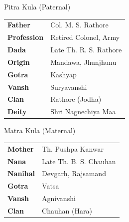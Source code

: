 \documentclass[11pt,a4paper]{article}
\begin{document}
\noindent
\begin{minipage}[t]{0.48\textwidth}
  \begin{regalbox}{Pitra Kula (Paternal)}
    \begin{tabularx}{\linewidth}{@{}l Y@{}}
      \textbf{Father} & Col. M. S. Rathore \\
      \textbf{Profession} & Retired Colonel, Army \\
      \textbf{Dada} & Late Th. R. S. Rathore \\
      \textbf{Origin} & Mandawa, Jhunjhunu \\
      \textbf{Gotra} & Kashyap \\
      \textbf{Vansh} & Suryavanshi \\
      \textbf{Clan} & Rathore (Jodha) \\
      \textbf{Deity} & Shri Nagnechiya Maa \\
    \end{tabularx}
  \end{regalbox}
\end{minipage}%
\hfill
\begin{minipage}[t]{0.48\textwidth}
  \begin{regalbox}{Matra Kula (Maternal)}
    \begin{tabularx}{\linewidth}{@{}l Y@{}}
      \textbf{Mother} & Th. Pushpa Kanwar \\
      \textbf{Nana} & Late Th. B. S. Chauhan \\
      \textbf{Nanihal} & Devgarh, Rajsamand \\
      \textbf{Gotra} & Vatsa \\
      \textbf{Vansh} & Agnivanshi \\
      \textbf{Clan} & Chauhan (Hara) \\
    \end{tabularx}
  \end{regalbox}
\end{minipage}
\par
\vspace{15pt}
\end{document}

